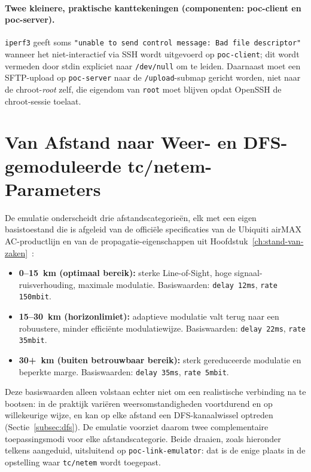 \paragraph{Twee kleinere, praktische kanttekeningen (componenten: poc-client en
poc-server).} \texttt{iperf3} geeft soms \texttt{"unable to send control message: Bad
file descriptor"} wanneer het niet-interactief via SSH wordt uitgevoerd op
\texttt{poc-client}; dit wordt vermeden door stdin expliciet naar \texttt{/dev/null} om
te leiden. Daarnaast moet een SFTP-upload op \texttt{poc-server} naar de
\texttt{/upload}-submap gericht worden, niet naar de chroot-\textit{root} zelf, die
eigendom van \texttt{root} moet blijven opdat OpenSSH de chroot-sessie toelaat.

\section{Van Afstand naar Weer- en DFS-gemoduleerde tc/netem-Parameters}%
\label{sec:sim-parameters}

De emulatie onderscheidt drie afstandscategorieën, elk met een eigen basistoestand die
is afgeleid van de officiële specificaties van de Ubiquiti airMAX AC-productlijn en van
de propagatie-eigenschappen uit Hoofdstuk~\ref{ch:stand-van-zaken}~\autocite{AirMaxTDMA, UISPGPSSync}:

\begin{itemize}
  \item \textbf{0--15~km (optimaal bereik):} sterke Line-of-Sight, hoge
        signaal-ruisverhouding, maximale modulatie. Basiswaarden:
        \texttt{delay 12ms}, \texttt{rate 150mbit}.
  \item \textbf{15--30~km (horizonlimiet):} adaptieve modulatie valt terug naar een
        robuustere, minder efficiënte modulatiewijze. Basiswaarden: \texttt{delay 22ms},
        \texttt{rate 35mbit}.
  \item \textbf{30+~km (buiten betrouwbaar bereik):} sterk gereduceerde modulatie en
        beperkte marge. Basiswaarden: \texttt{delay 35ms}, \texttt{rate 5mbit}.
\end{itemize}

Deze basiswaarden alleen volstaan echter niet om een realistische verbinding na te
bootsen: in de praktijk variëren weersomstandigheden voortdurend en op willekeurige
wijze, en kan op elke afstand een DFS-kanaalwissel optreden (Sectie~\ref{subsec:dfs}).
De emulatie voorziet daarom twee complementaire toepassingsmodi voor elke
afstandscategorie. Beide draaien, zoals hieronder telkens aangeduid, uitsluitend op
\texttt{poc-link-emulator}: dat is de enige plaats in de opstelling waar
\texttt{tc/netem} wordt toegepast.

